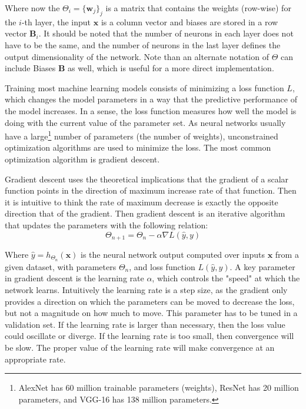 Where now the $\Theta_i = \{ \textbf{w}_j \}_j$ is a matrix that contains the weights (row-wise) for the $i$-th layer, the input $\textbf{x}$ is a column vector and biases are stored in a row vector $\textbf{B}_i$. It should be noted that the number of neurons in each layer does not have to be the same, and the number of neurons in the last layer defines the output dimensionality of the network. Note than an alternate notation of $\Theta$ can include Biases $\textbf{B}$ as well, which is useful for a more direct implementation.

Training most machine learning models consists of minimizing a loss function $L$, which changes the model parameters in a way that the predictive performance of the model increases. In a sense, the loss function measures how well the model is doing with the current value of the parameter set. As neural networks usually have a large\footnote{AlexNet has 60 million trainable parameters (weights), ResNet has 20 million parameters, and VGG-16 has 138 million parameters.} number of parameters (the number of weights), unconstrained optimization algorithms are used to minimize the loss. The most common optimization algorithm is gradient descent.

Gradient descent uses the theoretical implications that the gradient of a scalar function points in the direction of maximum increase rate of that function. Then it is intuitive to think the rate of maximum decrease is exactly the opposite direction that of the gradient. Then gradient descent is an iterative algorithm that updates the parameters with the following relation:
\vspace*{1em}
\begin{equation}
	\Theta_{n+1} = \Theta_{n} - \alpha \nabla L(\hat{y}, y)
	\label{background:simpleGD}
\end{equation}

Where $\hat{y} = h_{\Theta_{n}}(\textbf{x})$ is the neural network output computed over inputs $\textbf{x}$ from a given dataset, with parameters $\Theta_n$, and loss function $L(\hat{y}, y)$. A key parameter in gradient descent is the  learning rate $\alpha$, which controls the "speed" at which the network learns. Intuitively the learning rate is a step size, as the gradient only provides a direction on which the parameters can be moved to decrease the loss, but not a magnitude on how much to move. This parameter has to be tuned in a validation set. If the learning rate is larger than necessary, then the loss value could oscillate or diverge. If the learning rate is too small, then convergence will be slow. The proper value of the learning rate will make convergence at an appropriate rate.

